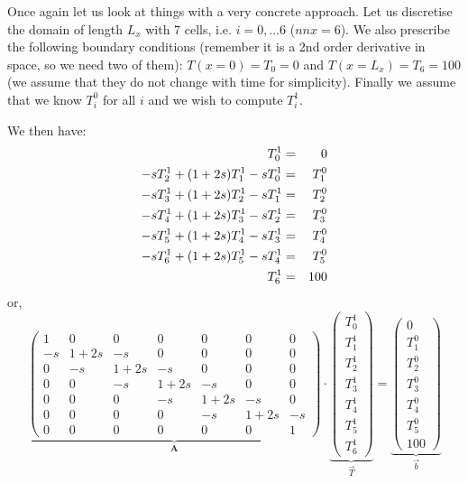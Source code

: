 Once again let us look at things with a very concrete approach. Let us discretise the 
domain of length $L_x$ with 7 cells, i.e. $i=0,\dots 6$ ($nnx=6$).
We also prescribe the following boundary conditions (remember it is a 2nd order derivative in space, 
so we need two of them): $T(x=0)=T_0=0$ and $T(x=L_x)=T_6=100$ (we assume that they 
do not change with time for simplicity). Finally we assume that we 
know $T_i^0$ for all $i$ and we wish to compute $T_i^1$.

We then have:
\begin{eqnarray}
T_0^1 &=& 0 \nonumber\\
-s T_{2}^{1} + (1+2s) T_{1}^{1} - s T_{0}^{1} &=& T_1^{0} \nonumber\\
-s T_{3}^{1} + (1+2s) T_{2}^{1} - s T_{1}^{1} &=& T_2^{0} \nonumber\\
-s T_{4}^{1} + (1+2s) T_{3}^{1} - s T_{2}^{1} &=& T_3^{0} \nonumber\\
-s T_{5}^{1} + (1+2s) T_{4}^{1} - s T_{3}^{1} &=& T_4^{0} \nonumber\\
-s T_{6}^{1} + (1+2s) T_{5}^{1} - s T_{4}^{1} &=& T_5^{0} \nonumber\\
T_6^1 &=& 100\nonumber
\end{eqnarray}
or, 
\[
\underbrace{
\left(
\begin{array}{ccccccc}
1 & 0 & 0 & 0 & 0 & 0 & 0  \\
-s & 1+2s & -s & 0 & 0 & 0 & 0 \\
0 & -s & 1+2s & -s & 0 & 0 & 0 \\
0 & 0 & -s & 1+2s & -s & 0 & 0 \\
0 & 0 & 0 & -s & 1+2s & -s & 0 \\
0 & 0 & 0 & 0 & -s & 1+2s & -s \\
0 & 0 & 0 & 0 & 0 & 0 & 1
\end{array}
\right)
}_{\bm A}
\cdot
\underbrace{
\left(
\begin{array}{ccccccc}
T_0^1 \\ T_1^1 \\ T_2^1 \\ T_3^1 \\ T_4^1 \\ T_5^1 \\ T_6^1  
\end{array}
\right)
}_{\vec{T}}
=
\underbrace{
\left(
\begin{array}{ccccccc}
0 \\ T_1^0\\ T_2^0\\ T_3^0\\ T_4^0\\ T_5^0 \\ 100
\end{array}
\right)
}_{\vec{b}}
\]

